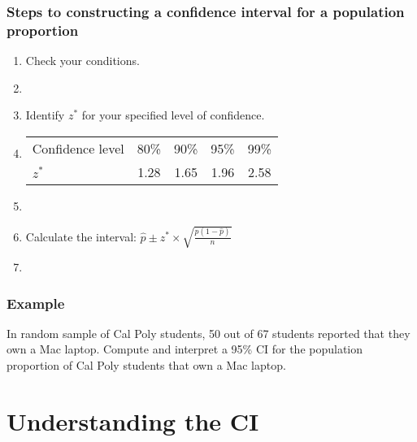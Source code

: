 \begin{frame}
\frametitle{Steps to constructing a confidence interval for a population proportion}
\begin{enumerate}
    \item
    Check your conditions.
    \item[]
    \item
    Identify $z^{*}$ for your specified level of confidence.
    \item[]
    \begin{tabular}{|lcccc|}
\hline
Confidence level & 80\% & 90\% & 95\% & 99\% \\
$z^{*}$  & 1.28 & 1.65 & 1.96 & 2.58 \\
\hline
\end{tabular}
    \item[]
    \item
    Calculate the interval: $\hat{p} \pm z^{*} \times \sqrt{\frac{\hat{p}(1-\hat{p})}{n}}$
    \item[]
\end{enumerate}
\end{frame}

\begin{frame}
\frametitle{Example}
In random sample of Cal Poly students,  50 out of 67 students reported that they own a Mac laptop.  Compute and interpret a 95\% CI for the population proportion of Cal Poly students that own a Mac laptop.
\vskip200pt
\end{frame}


\section[Understanding the CI]{Understanding the CI}
\begin{frame}
\end{frame}



